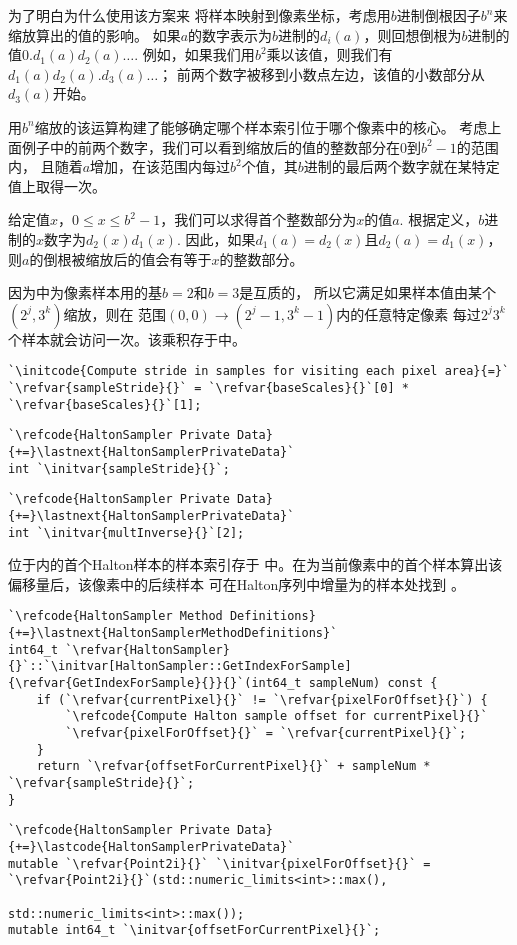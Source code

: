 为了明白为什么使用该方案来
将样本映射到像素坐标，考虑用$b$进制倒根因子$b^n$来缩放算出的值的影响。
如果$a$的数字表示为$b$进制的$d_i(a)$，则回想倒根为$b$进制的值$0.d_1(a)d_2(a)\ldots$.
例如，如果我们用$b^2$乘以该值，则我们有$d_1(a)d_2(a).d_3(a)\ldots$；
前两个数字被移到小数点左边，该值的小数部分从$d_3(a)$开始。

用$b^n$缩放的该运算构建了能够确定哪个样本索引位于哪个像素中的核心。
考虑上面例子中的前两个数字，我们可以看到缩放后的值的整数部分在0到$b^2-1$的范围内，
且随着$a$增加，在该范围内每过$b^2$个值，其$b$进制的最后两个数字就在某特定值上取得一次。

给定值$x$，$0\le x\le b^2-1$，我们可以求得首个整数部分为$x$的值$a$.
根据定义，$b$进制的$x$数字为$d_2(x)d_1(x)$.
因此，如果$d_1(a)=d_2(x)$且$d_2(a)=d_1(x)$，
则$a$的倒根被缩放后的值会有等于$x$的整数部分。

因为中为像素样本用的基$b=2$和$b=3$是互质的，
所以它满足如果样本值由某个$(2^j,3^k)$缩放，则在
范围$(0,0)\rightarrow(2^j-1,3^k-1)$内的任意特定像素
每过$2^j3^k$个样本就会访问一次。该乘积存于中。
\begin{lstlisting}
`\initcode{Compute stride in samples for visiting each pixel area}{=}`
`\refvar{sampleStride}{}` = `\refvar{baseScales}{}`[0] * `\refvar{baseScales}{}`[1];
\end{lstlisting}
\begin{lstlisting}
`\refcode{HaltonSampler Private Data}{+=}\lastnext{HaltonSamplerPrivateData}`
int `\initvar{sampleStride}{}`;
\end{lstlisting}
\begin{lstlisting}
`\refcode{HaltonSampler Private Data}{+=}\lastnext{HaltonSamplerPrivateData}`
int `\initvar{multInverse}{}`[2];
\end{lstlisting}

位于内的首个Halton样本的样本索引存于
中。在为当前像素中的首个样本算出该偏移量后，该像素中的后续样本
可在Halton序列中增量为的样本处找到
。
\begin{lstlisting}
`\refcode{HaltonSampler Method Definitions}{+=}\lastnext{HaltonSamplerMethodDefinitions}`
int64_t `\refvar{HaltonSampler}{}`::`\initvar[HaltonSampler::GetIndexForSample]{\refvar{GetIndexForSample}{}}{}`(int64_t sampleNum) const {
    if (`\refvar{currentPixel}{}` != `\refvar{pixelForOffset}{}`) {
        `\refcode{Compute Halton sample offset for currentPixel}{}`
        `\refvar{pixelForOffset}{}` = `\refvar{currentPixel}{}`;
    }
    return `\refvar{offsetForCurrentPixel}{}` + sampleNum * `\refvar{sampleStride}{}`;
}
\end{lstlisting}
\begin{lstlisting}
`\refcode{HaltonSampler Private Data}{+=}\lastcode{HaltonSamplerPrivateData}`
mutable `\refvar{Point2i}{}` `\initvar{pixelForOffset}{}` = `\refvar{Point2i}{}`(std::numeric_limits<int>::max(),
                                         std::numeric_limits<int>::max());
mutable int64_t `\initvar{offsetForCurrentPixel}{}`;
\end{lstlisting}

